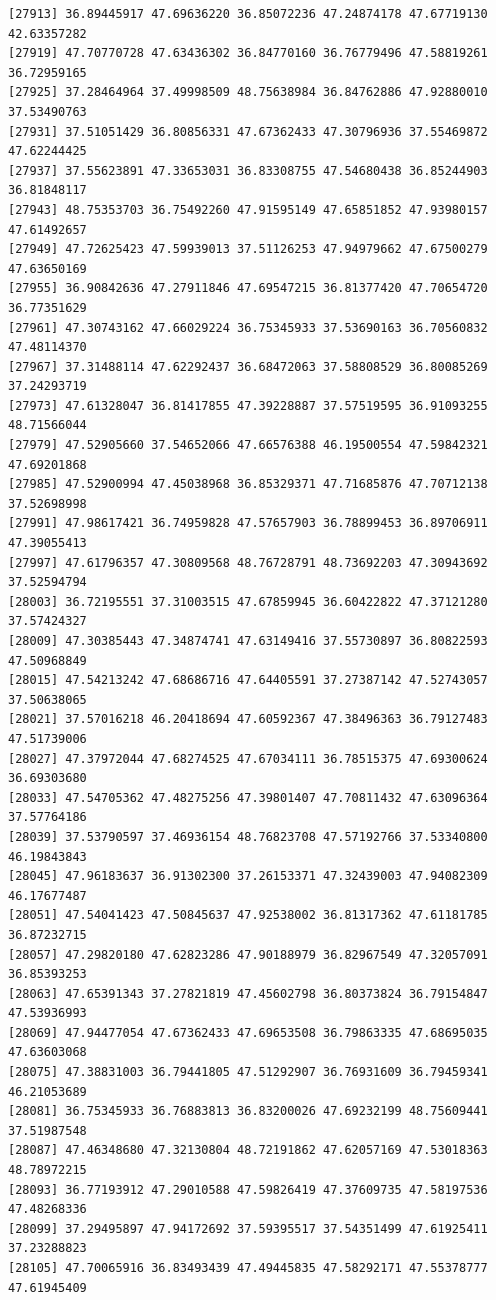 \documentclass[
  letterpaper,
  DIV=11,
  numbers=noendperiod]{scrartcl}
\begin{document}
\begin{verbatim}
[27913] 36.89445917 47.69636220 36.85072236 47.24874178 47.67719130 42.63357282
[27919] 47.70770728 47.63436302 36.84770160 36.76779496 47.58819261 36.72959165
[27925] 37.28464964 37.49998509 48.75638984 36.84762886 47.92880010 37.53490763
[27931] 37.51051429 36.80856331 47.67362433 47.30796936 37.55469872 47.62244425
[27937] 37.55623891 47.33653031 36.83308755 47.54680438 36.85244903 36.81848117
[27943] 48.75353703 36.75492260 47.91595149 47.65851852 47.93980157 47.61492657
[27949] 47.72625423 47.59939013 37.51126253 47.94979662 47.67500279 47.63650169
[27955] 36.90842636 47.27911846 47.69547215 36.81377420 47.70654720 36.77351629
[27961] 47.30743162 47.66029224 36.75345933 37.53690163 36.70560832 47.48114370
[27967] 37.31488114 47.62292437 36.68472063 37.58808529 36.80085269 37.24293719
[27973] 47.61328047 36.81417855 47.39228887 37.57519595 36.91093255 48.71566044
[27979] 47.52905660 37.54652066 47.66576388 46.19500554 47.59842321 47.69201868
[27985] 47.52900994 47.45038968 36.85329371 47.71685876 47.70712138 37.52698998
[27991] 47.98617421 36.74959828 47.57657903 36.78899453 36.89706911 47.39055413
[27997] 47.61796357 47.30809568 48.76728791 48.73692203 47.30943692 37.52594794
[28003] 36.72195551 37.31003515 47.67859945 36.60422822 47.37121280 37.57424327
[28009] 47.30385443 47.34874741 47.63149416 37.55730897 36.80822593 47.50968849
[28015] 47.54213242 47.68686716 47.64405591 37.27387142 47.52743057 37.50638065
[28021] 37.57016218 46.20418694 47.60592367 47.38496363 36.79127483 47.51739006
[28027] 47.37972044 47.68274525 47.67034111 36.78515375 47.69300624 36.69303680
[28033] 47.54705362 47.48275256 47.39801407 47.70811432 47.63096364 37.57764186
[28039] 37.53790597 37.46936154 48.76823708 47.57192766 37.53340800 46.19843843
[28045] 47.96183637 36.91302300 37.26153371 47.32439003 47.94082309 46.17677487
[28051] 47.54041423 47.50845637 47.92538002 36.81317362 47.61181785 36.87232715
[28057] 47.29820180 47.62823286 47.90188979 36.82967549 47.32057091 36.85393253
[28063] 47.65391343 37.27821819 47.45602798 36.80373824 36.79154847 47.53936993
[28069] 47.94477054 47.67362433 47.69653508 36.79863335 47.68695035 47.63603068
[28075] 47.38831003 36.79441805 47.51292907 36.76931609 36.79459341 46.21053689
[28081] 36.75345933 36.76883813 36.83200026 47.69232199 48.75609441 37.51987548
[28087] 47.46348680 47.32130804 48.72191862 47.62057169 47.53018363 48.78972215
[28093] 36.77193912 47.29010588 47.59826419 47.37609735 47.58197536 47.48268336
[28099] 37.29495897 47.94172692 37.59395517 37.54351499 47.61925411 37.23288823
[28105] 47.70065916 36.83493439 47.49445835 47.58292171 47.55378777 47.61945409

\end{verbatim}
\end{document}
